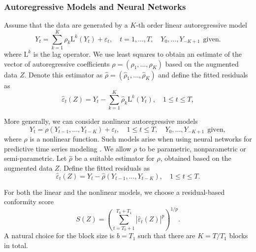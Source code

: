 \documentclass[final,12pt]{colt2018} %
\newcommand{\KW}[1]{\textcolor{cyan}{KW: #1}}
\begin{document}
\subsubsection{Autoregressive Models and Neural Networks}
Assume that the data are generated by a $K$-th order linear autoregressive model
\[
Y_t=\sum_{k=1}^K\rho_k \mathrm{L}^k(Y_{t})+ \varepsilon_t, \quad t=1,...,T, \quad Y_0,\dots,Y_{-K+1} ~~\text{given.} 
\]
where $\mathrm{L}^k$ is the lag operator. We use least squares to obtain an estimate of the vector of autoregressive coefficients $\rho=\left(\rho_1,\dots,\rho_K\right)$ based on the augmented data $Z$. Denote this estimator as  $\hat{\rho}=\left(\hat\rho_1,\dots,\hat\rho_K\right)$ and define the fitted residuals as  %
\[
\hat\varepsilon_t\left(Z\right)=Y_t-\sum_{k=1}^K\hat\rho_k \mathrm{L}^k(Y_{t}), \quad 1\le t\le T,
\]

More generally, we can consider nonlinear autoregressive models
\[
Y_{t}=\rho\left(Y_{t-1},\ldots,Y_{t-K}\right)+\varepsilon_{t},  \quad 1\le t\le T, \quad Y_0,\dots,Y_{-K+1} ~~\text{given}, 
\]
where $\rho $ is a nonlinear function. Such models arise when using neural networks for predictive time series modeling \citep[e.g.,][]{chen1999improved,chen2001semiparametric}. We allow $\rho $ to be parametric, nonparametric or semi-parametric. Let $\hat{\rho}$ be a suitable estimator for $\rho$, obtained based on the augmented data $Z$. Define the fitted residuals as
\[
\hat\varepsilon_t\left(Z\right)=Y_t-\hat{\rho}\left(Y_{t-1},\ldots,Y_{t-K}\right),  \quad 1\le t\le T.
\]

For both the linear and the nonlinear models, we choose a residual-based conformity score
\[
S(Z)=  \left(\sum_{t=T_0+1}^{T_0+T_1} \left|\hat{\varepsilon}_t\left(Z\right) \right|^p\right)^{1/p}.
\]
A natural choice for the block size is $b=T_1$ such that there are $K=T/T_1$ blocks in total.
\end{document}
